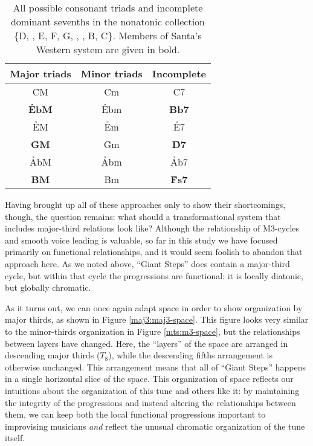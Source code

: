 \begin{table}[tbp]
  \centering
  \vspace{1em}
  \begin{tabular}{ccc}
    Major triads  & Minor triads & Incomplete \V \\
    \hline
    \rule[1em]{0ex}{1ex}%
    \h{CM}  & \h{Cm}    & \h{C7} \\
    \textbf{\h{EbM}} & \h{Ebm}   & \textbf{\h{Bb7}} \\
    \h{EM}  & \h{Em}    & \h{E7} \\
    \textbf{\h{GM}}  & \h{Gm}    & \textbf{\h{D7}} \\
    \h{AbM} & \h{Abm}   & \h{Ab7} \\
    \textbf{\h{BM}}  & \h{Bm}    & \textbf{\h{Fs7}} \\
  \end{tabular}
  \caption{All possible consonant triads and incomplete dominant sevenths in the
    nonatonic collection \{D, \Eflat, E, F\sharp, G, \Aflat, \Bflat, B,
    C\}. Members of Santa's Western system are given in bold.}
  \label{maj3:nonatonic-table}
\end{table}

Having brought up all of these approaches only to show their shortcomings,
though, the question remains: what should a transformational system that
includes major-third relations look like? Although the relationship of
M3-cycles and smooth voice leading is valuable, so far in this study we have
focused primarily on functional relationships, and it would seem foolish
to abandon that approach here. As we noted above, ``Giant Steps'' does contain
a major-third cycle, but within that cycle the progressions are functional: it
is locally diatonic, but globally chromatic.

As it turns out, we can once again adapt \tf space in order to show
organization by major thirds, as shown in Figure \ref{maj3:maj3-space}. This
figure looks very similar to the minor-thirds organization in Figure
\ref{mts:m3-space}, but the relationships between layers have
changed. Here, the ``layers'' of the space are arranged in
descending major thirds ($T_8$), while the descending fifths arrangement is
otherwise unchanged. This arrangement means that all of ``Giant Steps''
happens in a single horizontal slice of the space.
This organization of \tf space reflects our intuitions about the organization
of this tune and others like it: by maintaining the integrity of the \tfo
progressions and instead altering the relationships between them, we can keep
both the local functional progressions important to improvising musicians \emph{and}
reflect the unusual chromatic organization of the tune itself.


